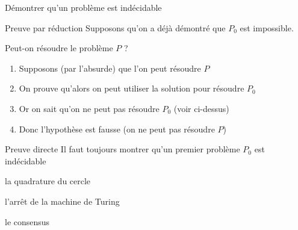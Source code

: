 
\begingroup

\begin{frame}[fragile]{Démontrer qu'un problème est indécidable}

  \begin{block}{Preuve par réduction}
    Supposons qu'on a déjà démontré que $P_0$ est impossible. 

    Peut-on résoudre le problème $P$ ?
    \begin{enumerate}
    \item Supposons (par l'absurde) que l'on peut résoudre $P$
    \item On prouve qu'alors on peut utiliser la solution pour résoudre $P_0$
    \item Or on sait qu'on ne peut pas résoudre $P_0$ (voir ci-dessus)
    \item Donc l'hypothèse est fausse (on ne peut pas résoudre $P$)
    \end{enumerate}
  \end{block}

  \pause

  \begin{block}{Preuve directe}
    Il faut toujours montrer qu'un premier problème $P_0$ est indécidable
    \begin{description}[labelwidth=\widthof{\bfseries Calcul}]
    \item[Géométrie plane :] la quadrature du cercle
    \item[Calcul séquentiel :] l'arrêt de la machine de Turing
    \item[Calcul réparti :] \alert{le consensus}
    \end{description}
  \end{block}

\end{frame}

\endgroup
\endinput
